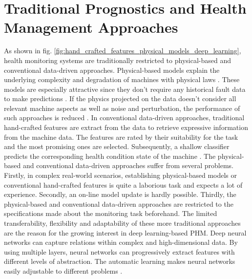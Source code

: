 \section{Traditional Prognostics and Health Management Approaches}
As shown in fig. \ref{fig:hand_crafted_features_physical_models_deep_learning}, health monitoring systems are traditionally restricted to physical-based and conventional data-driven approaches. Physical-based models explain the underlying complexity and degradation of machines with physical laws \cite{ZHAO2019213}. These models are especially attractive since they don't require any historical fault data to make predictions \cite{Benker2019}. If the physics projected on the data doesn't consider all relevant machine aspects as well as noise and perturbation, the performance of such approaches is reduced \cite{ZHAO2019213}. In conventional data-driven approaches, traditional hand-crafted features are extract from the data to retrieve expressive information from the machine data. The features are rated by their suitability for the task and the most promising ones are selected. Subsequently, a shallow classifier predicts the corresponding health condition state of the machine \cite{ZHAO2019213}. The physical-based and conventional data-driven approaches suffer from several problems. Firstly, in complex real-world scenarios, establishing physical-based models or conventional hand-crafted features is quite a laborious task and expects a lot of experience. Secondly, an on-line model update is hardly possible. Thirdly, the physical-based and conventional data-driven approaches are restricted to the specifications made about the monitoring task beforehand. The limited transferability, flexibility and adaptability of these more traditional approaches are the reason for the growing interest in deep learning-based PHM. Deep neural networks can capture relations within complex and high-dimensional data. By using multiple layers, neural networks can progressively extract features with different levels of abstraction. The automatic learning makes neural networks easily adjustable to different problems \cite{ZHAO2019213}.
